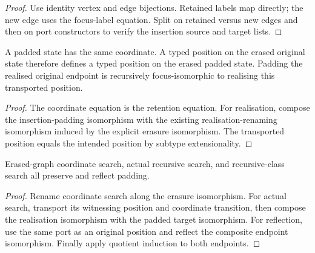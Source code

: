 \begin{proof}
Use identity vertex and edge bijections. Retained labels map directly; the new edge uses the focus-label equation. Split on retained versus new edges and then on port constructors to verify the insertion source and target lists.
\end{proof}



\begin{lemma}
A padded state has the same coordinate. A typed position on the erased original state therefore defines a typed position on the erased padded state. Padding the realised original endpoint is recursively focus-isomorphic to realising this transported position.
\end{lemma}

\begin{proof}
The coordinate equation is the retention equation. For realisation, compose the insertion-padding isomorphism with the existing realisation-renaming isomorphism induced by the explicit erasure isomorphism. The transported position equals the intended position by subtype extensionality.
\end{proof}





\begin{lemma}
Erased-graph coordinate search, actual recursive search, and recursive-class search all preserve and reflect padding.
\end{lemma}

\begin{proof}
Rename coordinate search along the erasure isomorphism. For actual search, transport its witnessing position and coordinate transition, then compose the realisation isomorphism with the padded target isomorphism. For reflection, use the same port as an original position and reflect the composite endpoint isomorphism. Finally apply quotient induction to both endpoints.
\end{proof}


